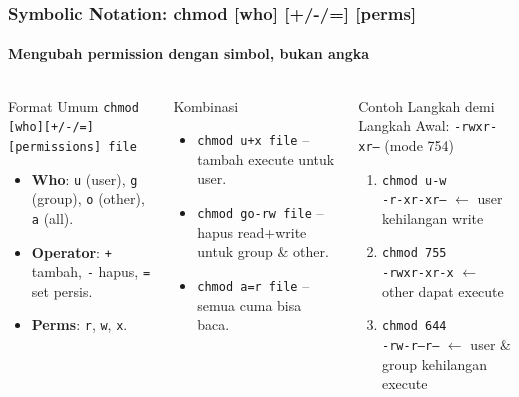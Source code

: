 \documentclass[t,aspectratio=169,xcolor=dvipsnames]{beamer}
\begin{document}
\begin{frame}[shrink=5]
    \frametitle{Symbolic Notation: chmod [who] [+/-/=] [perms]}
    \framesubtitle{Mengubah permission dengan simbol, bukan angka}

    \begin{columns}[T]
        \begin{block}{Format Umum}
            \small
            \texttt{chmod [who][+/-/=][permissions] file}
            \vspace{0.1cm}
            \begin{itemize}
                \item \textbf{Who}: \texttt{u} (user), \texttt{g} (group), \texttt{o} (other), \texttt{a} (all).
                \item \textbf{Operator}: \texttt{+} tambah, \texttt{-} hapus, \texttt{=} set persis.
                \item \textbf{Perms}: \texttt{r}, \texttt{w}, \texttt{x}.
            \end{itemize}
        \end{block}

        \vspace{0.15cm}
        \begin{block}{Kombinasi}
            \footnotesize
            \begin{itemize}
                \item \texttt{chmod u+x file} -- tambah execute untuk user.
                \item \texttt{chmod go-rw file} -- hapus read+write untuk group \& other.
                \item \texttt{chmod a=r file} -- semua cuma bisa baca.
            \end{itemize}
        \end{block}

        \begin{exampleblock}{Contoh Langkah demi Langkah}
            \footnotesize
            Awal: \texttt{-rwxr-xr--} (mode 754)
            \vspace{0.1cm}
            \begin{enumerate}
                \item \texttt{chmod u-w} \\[-2pt]
                \texttt{-r-xr-xr--} $\leftarrow$ user kehilangan write
                \vspace{0.08cm}
                \item \texttt{chmod 755} \\[-2pt]
                \texttt{-rwxr-xr-x} $\leftarrow$ other dapat execute
                \vspace{0.08cm}
                \item \texttt{chmod 644} \\[-2pt]
                \texttt{-rw-r--r--} $\leftarrow$ user \& group kehilangan execute
            \end{enumerate}
        \end{exampleblock}
    \end{columns}
\end{frame}
\end{document}
